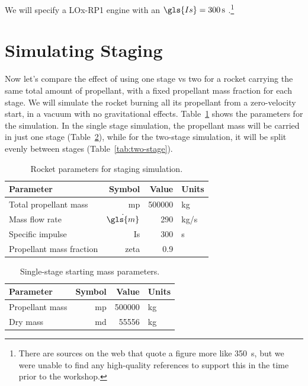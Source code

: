 \documentclass[12pt,openany]{book}
\begin{document}
We will specify a LOx-RP1 engine with an \(\gls{Is} = \SI{300}{\s}\) \cite{huzel1967}.\footnote{There are sources on the web that quote a figure more like \SI{350}{\s}, but we were unable to find any high-quality references to support this in the time prior to the workshop.}

\section{Simulating Staging}

Now let's compare the effect of using one stage vs two for a rocket carrying the same total amount of propellant, with a fixed propellant mass fraction for each stage. We will simulate the rocket burning all its propellant from a zero-velocity start, in a vacuum with no gravitational effects. Table~\ref{tab:staging-param} shows the parameters for the simulation. In the single stage simulation, the propellant mass will be carried in just one stage (Table~\ref{tab:single-stage}), while for the two-stage simulation, it will be split evenly between stages (Table~\ref{tab:two-stage}).

\begin{table}
  \centering
  \begin{tabular}[htbp]{ l r r l }
    \toprule
    Parameter                & Symbol            & Value        & Units     \\ \midrule
    Total propellant mass    & \gls{mp}          & \num{500000} & \si{kg}   \\
    Mass flow rate           & \(\dot{\gls{m}}\) & \num{290}    & \si{kg/s} \\
    Specific impulse         & \gls{Is}          & \num{300}    & \si{s}    \\
    Propellant mass fraction & \gls{zeta}        & \num{0.9}    &           \\
    \bottomrule
  \end{tabular}
  \caption{Rocket parameters for staging simulation.}
  \label{tab:staging-param}
\end{table}

\begin{table}
  \centering
  \begin{tabular}[htbp]{ l r r l }
    \toprule
    Parameter       & Symbol   & Value        & Units     \\ \midrule
    Propellant mass & \gls{mp} & \num{500000} & \si{kg}   \\
    Dry mass        & \gls{md} & \num{55556}  & \si{kg}   \\
    \bottomrule
  \end{tabular}
  \caption{Single-stage starting mass parameters.}
  \label{tab:single-stage}
\end{table}
\end{document}
